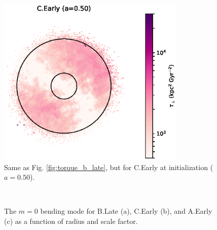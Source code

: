 \begin{figure}
	\centering
	\includegraphics[width=0.8\textwidth]{../figures/c_early_torque_a_0_5.eps}
	\caption{Same as Fig. \ref{fig:torque_b_late}, but for C.Early at initialization ($a=0.50$).} \label{fig:torque_c_early}
\end{figure}
\begin{figure}
	\centering
	\\
		\caption{The $m=0$ bending mode for B.Late (a), C.Early (b), and A.Early (c) as a function of radius and scale factor. }
\end{figure}

